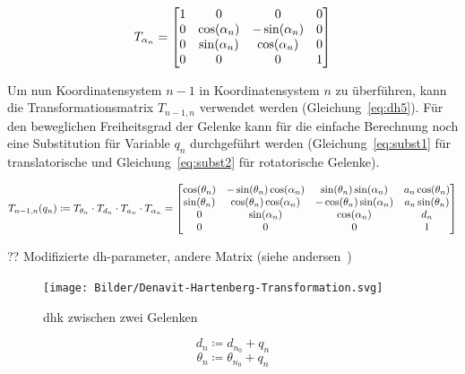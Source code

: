 \begin{equation}
    T_{\alpha_n} =
    \begin{bmatrix}
        1 & 0   & 0    & 0 \\
        0 & \cos(\alpha_n) & -\sin(\alpha_n) & 0 \\
        0 & \sin(\alpha_n) & \cos(\alpha_n)  & 0 \\
        0 & 0   & 0    & 1 \\
    \end{bmatrix}
    \label{eq:dh4}
\end{equation}

Um nun Koordinatensystem $n-1$ in Koordinatensystem $n$ zu überführen, kann die Transformationsmatrix $T_{n-1,n}$ verwendet werden (Gleichung~\ref{eq:dh5}).
Für den beweglichen Freiheitsgrad der Gelenke kann für die einfache Berechnung noch eine Substitution für Variable $q_n$ durchgeführt werden (Gleichung~\ref{eq:subst1} für translatorische und Gleichung~\ref{eq:subst2} für rotatorische Gelenke).

\begin{equation}
    T_{n-1,n}(q_n) \coloneqq T_{\theta_n} \cdot T_{d_n} \cdot T_{a_n} \cdot T_{\alpha_n} =
    \begin{bmatrix}
        \cos(\theta_n) & -\sin(\theta_n)\cos(\alpha_n) & \sin(\theta_n)\sin(\alpha_n)  & a_n\cos(\theta_n) \\
        \sin(\theta_n) & \cos(\theta_n)\cos(\alpha_n)  & -\cos(\theta_n)\sin(\alpha_n) & a_n\sin(\theta_n) \\
        0   & \sin(\alpha_n)     & \cos(\alpha_n)     & d_n    \\
        0   & 0       & 0       & 1      \\
    \end{bmatrix}
    \label{eq:dh5}
\end{equation}

?? Modifizierte dh-parameter, andere Matrix (siehe andersen~\cite{rasmusandersenKinematicsUR52018})

\begin{figure}[h]
    \centering
    \texttt{[image: Bilder/Denavit-Hartenberg-Transformation.svg]}
    \caption{\ac{dhk} zwischen zwei Gelenken~\cite{jahobrCoordinateSystemsDenavitHartenberg2007}}\label{fig:dh-konvention1}
\end{figure}


\begin{equation}
    d_n \coloneqq d_{n_0} + q_n    \label{eq:subst1}
\end{equation}
\begin{equation}
    \theta_n \coloneqq \theta_{n_0} + q_n    \label{eq:subst2}
\end{equation}


